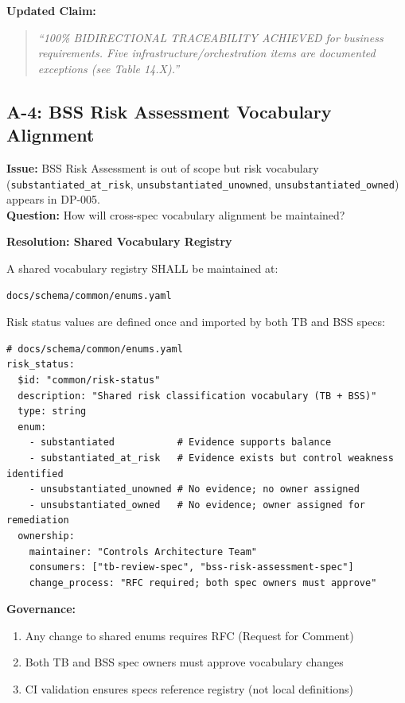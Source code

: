 \textbf{Updated Claim:}
\begin{quote}
\textit{``100\% BIDIRECTIONAL TRACEABILITY ACHIEVED for business requirements. 
Five infrastructure/orchestration items are documented exceptions (see Table 14.X).''}
\end{quote}

\subsection{A-4: BSS Risk Assessment Vocabulary Alignment}
\label{sec:a4-bss-vocabulary}

\begin{tcolorbox}[colback=orange!5,colframe=orange!70,title=\faIcon{exclamation-circle} Finding A-4: BSS Cross-Spec Vocabulary]
\textbf{Issue:} BSS Risk Assessment is out of scope but risk vocabulary 
(\texttt{substantiated\_at\_risk}, \texttt{unsubstantiated\_unowned}, 
\texttt{unsubstantiated\_owned}) appears in DP-005.\\
\textbf{Question:} How will cross-spec vocabulary alignment be maintained?
\end{tcolorbox}

\textbf{Resolution: Shared Vocabulary Registry}

\begin{tcolorbox}[colback=green!5,colframe=green!70,title=\faIcon{check-circle} Resolution: Cross-Spec Enum Registry]
A shared vocabulary registry SHALL be maintained at:
\begin{verbatim}
docs/schema/common/enums.yaml
\end{verbatim}

Risk status values are defined once and imported by both TB and BSS specs:

\begin{lstlisting}[language=yamlx,caption={Shared Enum Registry (enums.yaml)}]
# docs/schema/common/enums.yaml
risk_status:
  $id: "common/risk-status"
  description: "Shared risk classification vocabulary (TB + BSS)"
  type: string
  enum:
    - substantiated           # Evidence supports balance
    - substantiated_at_risk   # Evidence exists but control weakness identified
    - unsubstantiated_unowned # No evidence; no owner assigned
    - unsubstantiated_owned   # No evidence; owner assigned for remediation
  ownership:
    maintainer: "Controls Architecture Team"
    consumers: ["tb-review-spec", "bss-risk-assessment-spec"]
    change_process: "RFC required; both spec owners must approve"
\end{lstlisting}

\textbf{Governance:}
\begin{enumerate}
    \item Any change to shared enums requires RFC (Request for Comment)
    \item Both TB and BSS spec owners must approve vocabulary changes
    \item CI validation ensures specs reference registry (not local definitions)
\end{enumerate}
\end{tcolorbox}

